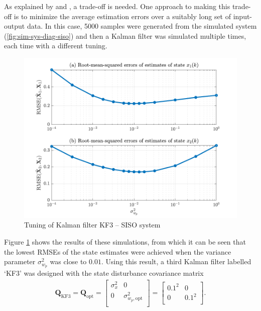 As explained by \cite{andersson_adaptive_1985} and \cite{robertson_detection_1995}, a trade-off is needed. One approach to making this trade-off is to minimize the average estimation errors over a suitably long set of input-output data. In this case, 5000 samples were generated from the simulated system (\ref{fig:sim-sys-diag-siso}) and then a Kalman filter was simulated multiple times, each time with a different tuning. 
\begin{figure}[htp]
	\centering
	\includegraphics[width=13cm]{images/rod_obs_sim1_3KF_Q_seed_6.pdf}
	\caption{Tuning of Kalman filter KF3 – SISO system}
	\label{fig:sim-sys-siso-KF3-tuning}
\end{figure}
Figure \ref{fig:sim-sys-siso-KF3-tuning} shows the results of these simulations, from which it can be seen that the lowest \gls{RMSE}s of the state estimates were achieved when the variance parameter $\sigma_{w_p}^2$ was close to $0.01$. Using this result, a third Kalman filter labelled `KF3' was designed with the state disturbance covariance matrix 
\begin{equation} \label{eq:sim-sys-siso-KF3-Q}
	\begin{aligned}
		\mathbf{Q}_{\text{KF3}}=\mathbf{Q}_{\text{opt}}=\begin{bmatrix}
			\sigma_{x}^2 & 0 \\
			0 & \sigma_{w_p,\text{opt}}^2 \\
		\end{bmatrix}=\begin{bmatrix}
			0.1^2 & 0 \\
			0 & 0.1^2 \\
		\end{bmatrix}.
	\end{aligned}
\end{equation}

